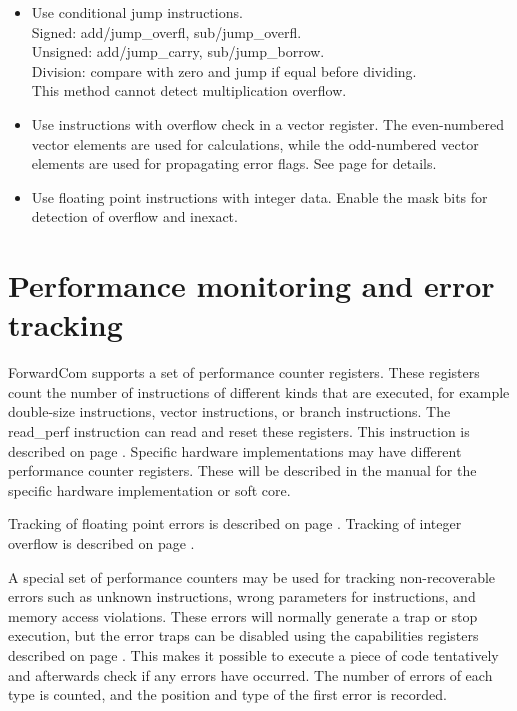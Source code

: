 \documentclass[forwardcom.tex]{subfiles}
\begin{document}
\begin{itemize}
  \item Use conditional jump instructions. \\
    Signed: add/jump\_overfl, sub/jump\_overfl. \\
    Unsigned: add/jump\_carry, sub/jump\_borrow. \\
    Division: compare with zero and jump if equal before dividing. \\
    This method cannot detect multiplication overflow.  
  
  \item Use instructions with overflow check in a vector register. 
    The even-numbered vector elements are used for calculations, while
    the odd-numbered vector elements are used for propagating error flags. 
    See page \pageref{table:addOcInstruction} for details. 
    
  \item Use floating point instructions with integer data. 
    Enable the mask bits for detection of overflow and inexact.
  
\end{itemize}
\vv


\section{Performance monitoring and error tracking}
ForwardCom supports a set of performance counter registers. These registers count the number of instructions of different kinds that are executed, for example double-size instructions, vector instructions, or branch instructions. The read\_perf instruction can read and reset these registers. This instruction is described on page \pageref{table:readPerfInstruction}. Specific hardware implementations may have different performance counter registers. These will be described in the manual for the specific hardware implementation or soft core.
\vv

Tracking of floating point errors is described on page \pageref{FloatingPointErrors}. Tracking of integer overflow is described on page \pageref{integerOverflowDetection}.
\vv

A special set of performance counters may be used for tracking non-recoverable errors such as unknown instructions, wrong parameters for instructions, and memory access violations. These errors will normally generate a trap or stop execution, but the error traps can be disabled using the capabilities registers described on page \pageref{table:capabilitiesRegisters}. This makes it possible to execute a piece of code tentatively and afterwards check if any errors have occurred. The number of errors of each type is counted, and the position and type of the first error is recorded.
\vv
\end{document}
